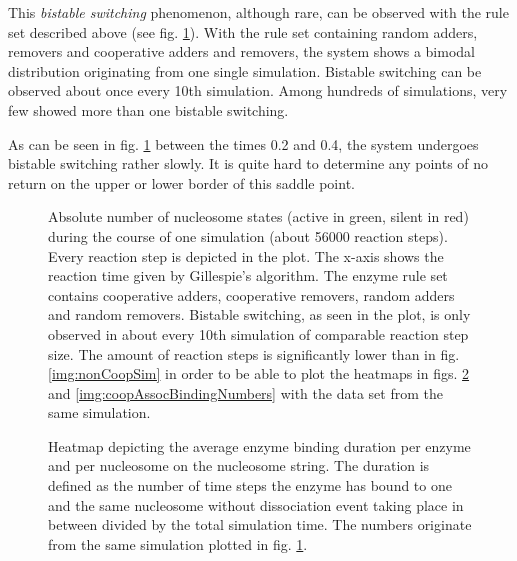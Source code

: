             This \textit{bistable switching} phenomenon, although rare, can be observed with the rule set described above (see fig. \ref{img:nonCyclBistability_runPlot2}). With the rule set containing random adders, removers and cooperative adders and removers, the system shows a bimodal distribution originating from one single simulation. Bistable switching can be observed about once every 10th simulation. Among hundreds of simulations, very few showed more than one bistable switching.

            As can be seen in fig. \ref{img:nonCyclBistability_runPlot2} between the times 0.2 and 0.4, the system undergoes bistable switching rather slowly. It is quite hard to determine any points of no return on the upper or lower border of this saddle point.

            \begin{figure}[htpb!]
                \centering
                \caption{Absolute number of nucleosome states (active in green, silent in red) during the course of one simulation (about 56000 reaction steps). Every reaction step is depicted in the plot. The x-axis shows the reaction time given by Gillespie's algorithm. The enzyme rule set contains cooperative adders, cooperative removers, random adders and random removers. Bistable switching, as seen in the plot, is only observed in about every 10th simulation of comparable reaction step size. The amount of reaction steps is significantly lower than in fig. \ref{img:nonCoopSim} in order to be able to plot the heatmaps in figs. \ref{img:coopAssocBindingDuration} and \ref{img:coopAssocBindingNumbers} with the data set from the same simulation.}
                \label{img:nonCyclBistability_runPlot2}
            \end{figure}

             \begin{figure}[htpb!]
                \centering
                \caption{Heatmap depicting the average enzyme binding duration per enzyme and per nucleosome on the nucleosome string. The duration is defined as the number of time steps the enzyme has bound to one and the same nucleosome without dissociation event taking place in between divided by the total simulation time. The numbers originate from the same simulation plotted in fig. \ref{img:nonCyclBistability_runPlot2}.}
                \label{img:coopAssocBindingDuration}
            \end{figure}

